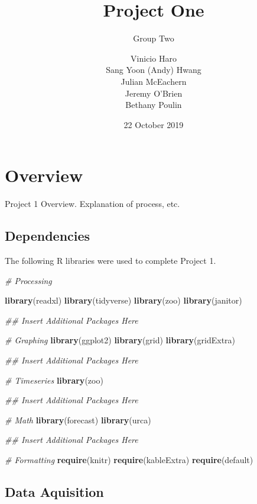 \documentclass[openany]{book}
\title{Project One}
\subtitle{Group Two}
\author{Vinicio Haro \\ Sang Yoon (Andy) Hwang \\ Julian McEachern \\ Jeremy O'Brien \\ Bethany Poulin}
\date{22 October 2019}
\newenvironment{Shaded}{\begin{snugshade}}{\end{snugshade}}
\newcommand{\CommentTok}[1]{\textcolor[rgb]{0.56,0.35,0.01}{\textit{#1}}}
\newcommand{\KeywordTok}[1]{\textcolor[rgb]{0.13,0.29,0.53}{\textbf{#1}}}
\newcommand{\NormalTok}[1]{#1}
\begin{document}
\maketitle

{
\setcounter{tocdepth}{1}
\tableofcontents
}
\hypertarget{overview}{%
\chapter*{Overview}\label{overview}}

Project 1 Overview. Explanation of process, etc.

\hypertarget{dependencies}{%
\section*{Dependencies}\label{dependencies}}

The following R libraries were used to complete Project 1.

\begin{Shaded}
\begin{Highlighting}[]
\CommentTok{# Processing}

\KeywordTok{library}\NormalTok{(readxl)}
\KeywordTok{library}\NormalTok{(tidyverse)}
\KeywordTok{library}\NormalTok{(zoo)}
\KeywordTok{library}\NormalTok{(janitor)}

\CommentTok{## Insert Additional Packages Here}

\CommentTok{# Graphing}
\KeywordTok{library}\NormalTok{(ggplot2)}
\KeywordTok{library}\NormalTok{(grid)}
\KeywordTok{library}\NormalTok{(gridExtra)}

\CommentTok{## Insert Additional Packages Here}

\CommentTok{# Timeseries }
\KeywordTok{library}\NormalTok{(zoo)}

\CommentTok{## Insert Additional Packages Here}

\CommentTok{# Math}
\KeywordTok{library}\NormalTok{(forecast)}
\KeywordTok{library}\NormalTok{(urca)}

\CommentTok{## Insert Additional Packages Here}

\CommentTok{# Formatting}
\KeywordTok{require}\NormalTok{(knitr)}
\KeywordTok{require}\NormalTok{(kableExtra)}
\KeywordTok{require}\NormalTok{(default)}
\end{Highlighting}
\end{Shaded}

\hypertarget{aquisition}{%
\section*{Data Aquisition}\label{aquisition}}
\end{document}
